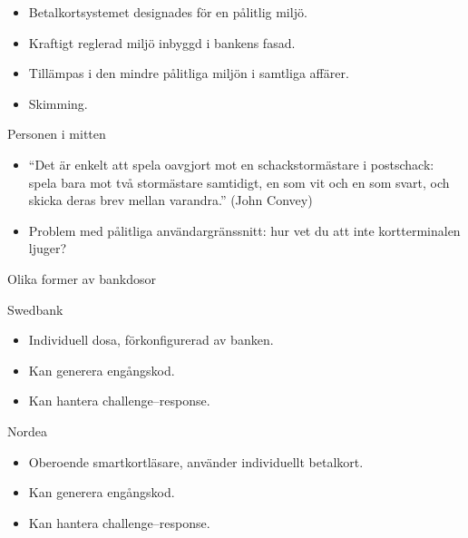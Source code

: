 \begin{frame}
  \begin{itemize}
    \item Betalkortsystemet designades för en pålitlig miljö.
    \item Kraftigt reglerad miljö inbyggd i bankens fasad.
    \item Tillämpas i den mindre pålitliga miljön i samtliga affärer.
    \item Skimming.
  \end{itemize}
\end{frame}

\begin{frame}{Personen i mitten}
  \begin{itemize}
    \item \enquote{Det är enkelt att spela oavgjort mot en schackstormästare 
        i postschack: spela bara mot två stormästare samtidigt, en som vit och 
        en som svart, och skicka deras brev mellan varandra.} (John Convey)
    \item Problem med pålitliga användargränssnitt: hur vet du att inte 
      kortterminalen ljuger?
  \end{itemize}
\end{frame}

\begin{frame}{Olika former av bankdosor}
  \begin{block}{Swedbank}
    \begin{itemize}
      \item Individuell dosa, förkonfigurerad av banken.
      \item Kan generera engångskod.
      \item Kan hantera challenge--response.
    \end{itemize}
  \end{block}

  \pause{}

  \begin{block}{Nordea}
    \begin{itemize}
      \item Oberoende smartkortläsare, använder individuellt betalkort.
      \item Kan generera engångskod.
      \item Kan hantera challenge--response.
    \end{itemize}
  \end{block}
\end{frame}


